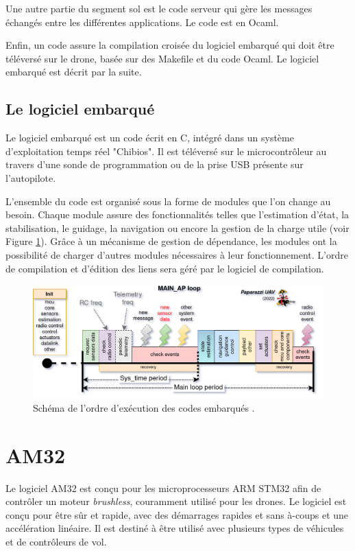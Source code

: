 Une autre partie du segment sol est le code serveur qui gère les messages échangés entre les différentes applications. Le code est en Ocaml.

Enfin, un code assure la compilation croisée du logiciel embarqué qui doit être téléversé sur le drone, basée sur des Makefile et du code Ocaml. Le logiciel embarqué est décrit par la suite.

 \subsection*{Le logiciel embarqué}
 Le logiciel embarqué est un code écrit en C, intégré dans un système d'exploitation temps réel "Chibios". Il est téléversé sur le microcontrôleur au travers d'une sonde de programmation ou de la prise USB présente sur l'autopilote.

 L'ensemble du code est organisé sous la forme de modules que l'on change au besoin. Chaque module assure des fonctionnalités telles que l'estimation d'état, la stabilisation, le guidage, la navigation ou encore la gestion de la charge utile (voir Figure \ref{fig:schedulingpaparazzi}). Grâce à un mécanisme de gestion de dépendance, les modules ont la possibilité de charger d'autres modules nécessaires à leur fonctionnement. L'ordre de compilation et d'édition des liens sera géré par le logiciel de compilation.


 \begin{figure}[ht!]
    \centerline{
    \includegraphics[trim=0cm 0cm 0cm 0cm,clip,width=0.7\columnwidth]{figures/PPRZ_Main_ap_loop.png}}
    \caption{Schéma de l'ordre d'exécution des codes embarqués \cite{RTDpaparazzi2022}.}
    \label{fig:schedulingpaparazzi}
\end{figure}

 
\section*{AM32}
\label{sec:AM32}
Le logiciel AM32 est conçu pour les microprocesseurs ARM STM32 afin de contrôler un moteur \textit{brushless}, couramment utilisé pour les drones. Le logiciel est conçu pour être sûr et rapide, avec des démarrages rapides et sans à-coups et une accélération linéaire. Il est destiné à être utilisé avec plusieurs types de véhicules et de contrôleurs de vol. 

